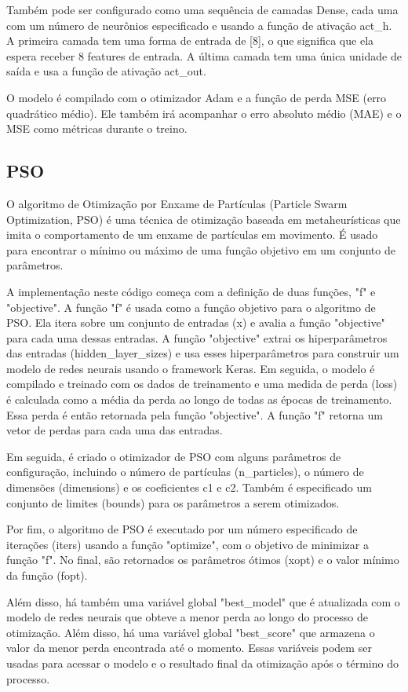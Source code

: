 \documentclass[10pt]{article}
\begin{document}
Também pode ser configurado como uma sequência de camadas Dense, cada 
uma com um número de neurônios especificado e usando a função de ativação act\_h.
A primeira camada tem uma forma de entrada de [8], o que significa que ela 
espera receber 8 features de entrada. A última camada tem uma única unidade 
de saída e usa a função de ativação act\_out.

O modelo é compilado com o otimizador Adam e a função de perda MSE 
(erro quadrático médio). Ele também irá acompanhar o erro absoluto médio 
(MAE) e o MSE como métricas durante o treino.

\subsection{PSO}
O algoritmo de Otimização por Enxame de Partículas 
(Particle Swarm Optimization, PSO) é uma técnica de otimização baseada em 
metaheurísticas que imita o comportamento de um enxame de partículas em 
movimento. É usado para encontrar o mínimo ou máximo de uma função objetivo 
em um conjunto de parâmetros.

A implementação neste código começa com a definição de duas funções, 
"f" e "objective". A função "f" é usada como a função objetivo para o 
algoritmo de PSO. Ela itera sobre um conjunto de entradas (x) e avalia a 
função "objective" para cada uma dessas entradas. A função "objective" 
extrai os hiperparâmetros das entradas (hidden\_layer\_sizes) e usa esses 
hiperparâmetros para construir um modelo de redes neurais usando o framework 
Keras. Em seguida, o modelo é compilado e treinado com os dados de 
treinamento e uma medida de perda (loss) é calculada como a média da perda ao 
longo de todas as épocas de treinamento. Essa perda é então retornada pela 
função "objective". A função "f" retorna um vetor de perdas para cada uma das 
entradas.

Em seguida, é criado o otimizador de PSO com alguns parâmetros de configuração,
incluindo o número de partículas (n\_particles), o número de dimensões 
(dimensions) e os coeficientes c1 e c2. Também é especificado um conjunto de 
limites (bounds) para os parâmetros a serem otimizados.

Por fim, o algoritmo de PSO é executado por um número especificado de 
iterações (iters) usando a função "optimize", com o objetivo de minimizar a 
função "f". No final, são retornados os parâmetros ótimos (xopt) e o valor 
mínimo da função (fopt).

Além disso, há também uma variável global "best\_model" que é 
atualizada com o modelo de redes neurais que obteve a menor perda ao longo 
do processo de otimização. Além disso, há uma variável global "best\_score" 
que armazena o valor da menor perda encontrada até o momento. Essas variáveis 
podem ser usadas para acessar o modelo e o resultado final da otimização após 
o término do processo.
\end{document}
